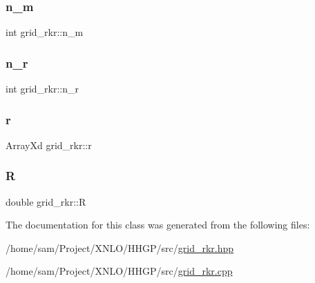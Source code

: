 \subsubsection{\texorpdfstring{n\+\_\+m}{n\_m}}
{\footnotesize\ttfamily int grid\+\_\+rkr\+::n\+\_\+m}

\mbox{\label{classgrid__rkr_a332c5e88e5c3a08e67b11254173d9530}} 
\subsubsection{\texorpdfstring{n\+\_\+r}{n\_r}}
{\footnotesize\ttfamily int grid\+\_\+rkr\+::n\+\_\+r}

\mbox{\label{classgrid__rkr_a0c68f261e53153368d0edab4c9a8ef88}} 
\subsubsection{\texorpdfstring{r}{r}}
{\footnotesize\ttfamily Array\+Xd grid\+\_\+rkr\+::r}

\mbox{\label{classgrid__rkr_a2da8ae00c520a66c9cac2784a2149dcb}} 
\subsubsection{\texorpdfstring{R}{R}}
{\footnotesize\ttfamily double grid\+\_\+rkr\+::R}



The documentation for this class was generated from the following files\+:\begin{DoxyCompactItemize}
\item 
/home/sam/\+Project/\+X\+N\+L\+O/\+H\+H\+G\+P/src/\hyperlink{grid__rkr_8hpp}{grid\+\_\+rkr.\+hpp}\item 
/home/sam/\+Project/\+X\+N\+L\+O/\+H\+H\+G\+P/src/\hyperlink{grid__rkr_8cpp}{grid\+\_\+rkr.\+cpp}\end{DoxyCompactItemize}
